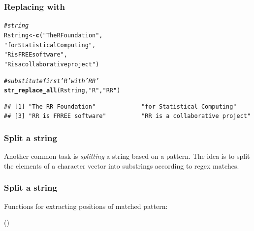 \documentclass[12pt]{beamer}\usepackage[]{graphicx}\usepackage[]{color}
\makeatletter
\newcommand{\hlstr}[1]{\textcolor[rgb]{0.192,0.494,0.8}{#1}}%
\newcommand{\hlcom}[1]{\textcolor[rgb]{0.678,0.584,0.686}{\textit{#1}}}%
\newcommand{\hlstd}[1]{\textcolor[rgb]{0.345,0.345,0.345}{#1}}%
\newcommand{\hlkwb}[1]{\textcolor[rgb]{0.69,0.353,0.396}{#1}}%
\newcommand{\hlkwd}[1]{\textcolor[rgb]{0.737,0.353,0.396}{\textbf{#1}}}%
\newenvironment{kframe}{%
 \def\at@end@of@kframe{}%
 \ifinner\ifhmode%
  \def\at@end@of@kframe{\end{minipage}}%
  \begin{minipage}{\columnwidth}%
 \fi\fi%
 \def\FrameCommand##1{\hskip\@totalleftmargin \hskip-\fboxsep
 \colorbox{shadecolor}{##1}\hskip-\fboxsep
     \hskip-\linewidth \hskip-\@totalleftmargin \hskip\columnwidth}%
 \MakeFramed {\advance\hsize-\width
   \@totalleftmargin\z@ \linewidth\hsize
   \@setminipage}}%
 {\par\unskip\endMakeFramed%
 \at@end@of@kframe}
\newenvironment{knitrout}{}{} %
\makeatother
\begin{document}

\begin{frame}[fragile]
\frametitle{Replacing with }

\begin{knitrout}\scriptsize
{}\color{fgcolor}\begin{kframe}
\begin{alltt}
\hlcom{# string}
\hlstd{Rstring} \hlkwb{<-} \hlkwd{c}\hlstd{(}\hlstr{"The R Foundation"}\hlstd{,}
            \hlstr{"for Statistical Computing"}\hlstd{,}
            \hlstr{"R is FREE software"}\hlstd{,}
            \hlstr{"R is a collaborative project"}\hlstd{)}

\hlcom{# substitute first 'R' with 'RR'}
\hlkwd{str_replace_all}\hlstd{(Rstring,} \hlstr{"R"}\hlstd{,} \hlstr{"RR"}\hlstd{)}
\end{alltt}
\begin{verbatim}
## [1] "The RR Foundation"             "for Statistical Computing"    
## [3] "RR is FRREE software"          "RR is a collaborative project"
\end{verbatim}
\end{kframe}
\end{knitrout}

\end{frame}


\begin{frame}
\begin{center}
\Huge{}
\end{center}
\end{frame}


\begin{frame}
\frametitle{Split a string}

Another common task is \textit{splitting} a string based on a pattern. The idea is to split the elements of a character vector into substrings according to regex matches.

\end{frame}


\begin{frame}
\frametitle{Split a string}

Functions for extracting positions of matched pattern: 
\bbi
  \item {}
  \item {} ()
\ei

\end{frame}
\end{document}
